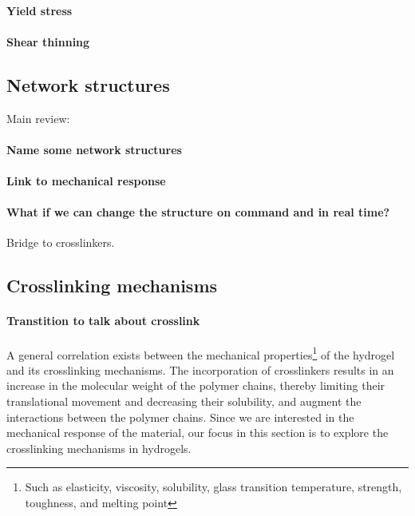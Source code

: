 \paragraph{Yield stress}

\paragraph{Shear thinning}

\subsection{Network structures}\label{ch1:NetworkStructure}

Main review:\citep{guPolymerNetworksPlastics2020,sheikoArchitecturalCodeRubber2019}

\paragraph{Name some network structures}

\paragraph{Link to mechanical response}

\paragraph{What if we can change the structure on command and in real time?} Bridge to crosslinkers.

\subsection{Crosslinking mechanisms}\label{ch1:Cross-linking}

\paragraph{Transtition to talk about crosslink}
A general correlation exists between the mechanical properties\footnote{Such as elasticity, viscosity, solubility, glass transition temperature, strength, toughness, and melting point\citep{priyaComprehensiveReviewHydrogel2024}} of the hydrogel and its crosslinking mechanisms.
The incorporation of crosslinkers results in an increase in the molecular weight of the polymer chains, thereby limiting their translational movement and decreasing their solubility, and augment the interactions between the polymer chains\citep{priyaComprehensiveReviewHydrogel2024}.
Since we are interested in the mechanical response of the material, our focus in this section is to explore the crosslinking mechanisms in hydrogels.

